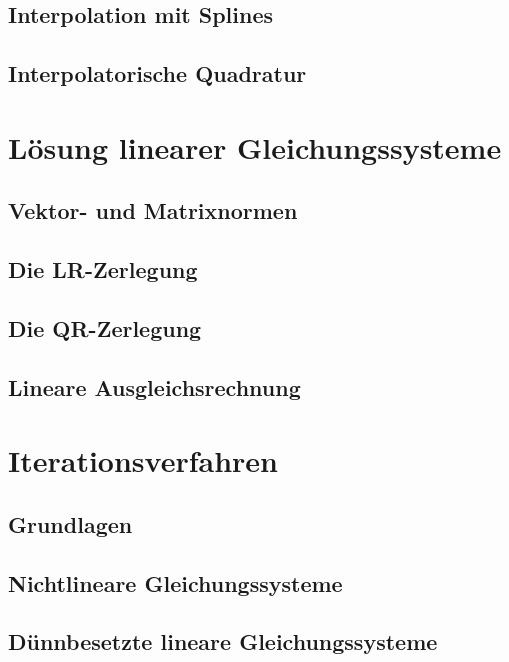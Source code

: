 \section{Interpolation mit Splines}


%

\section{Interpolatorische Quadratur}


\chapter{Lösung linearer Gleichungssysteme}

\section{Vektor- und Matrixnormen}


\section{Die LR-Zerlegung}


\section{Die QR-Zerlegung}


\section{Lineare Ausgleichsrechnung}


\chapter{Iterationsverfahren}

\section{Grundlagen}

\section{Nichtlineare Gleichungssysteme}

\section{Dünnbesetzte lineare Gleichungssysteme}




\printindex

